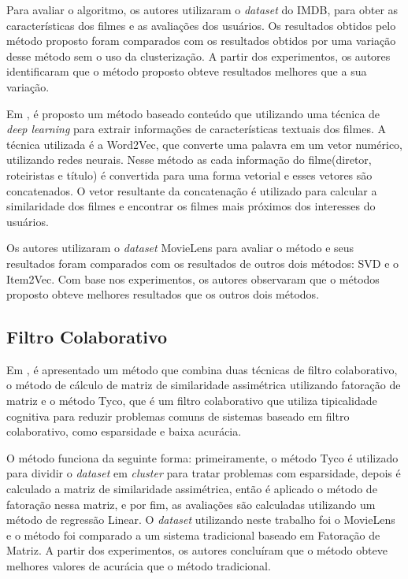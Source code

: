 Para avaliar o algoritmo, os autores utilizaram o \textit{dataset} do IMDB, para obter as características dos filmes e as avaliações dos usuários. Os resultados obtidos pelo método proposto foram comparados com os resultados obtidos por uma variação desse método sem o uso da clusterização. A partir dos experimentos, os autores identificaram que o método proposto obteve resultados melhores que a sua variação.

Em \cite{yoon2018movie}, é proposto um método baseado conteúdo que utilizando uma técnica de \textit{deep learning} para extrair informações de características textuais dos filmes. A técnica utilizada é a Word2Vec, que converte uma palavra em um vetor numérico, utilizando redes neurais. Nesse método as cada informação do filme(diretor, roteiristas e título) é convertida para uma forma vetorial e esses vetores são concatenados. O vetor resultante da concatenação é utilizado para calcular a similaridade dos  filmes e encontrar os filmes mais próximos dos interesses do usuários. 

Os autores utilizaram o \textit{dataset} MovieLens para avaliar o método e seus resultados foram comparados com os resultados de outros dois métodos: SVD e o Item2Vec. Com base nos experimentos, os autores observaram que o métodos proposto obteve melhores resultados que os outros dois métodos.


\subsection{Filtro Colaborativo}
Em \cite{katarya2016effectivecollaborative},  é apresentado um método que combina duas técnicas de filtro colaborativo, o método de cálculo de matriz de similaridade assimétrica utilizando fatoração de matriz e o método Tyco, que é um filtro colaborativo que utiliza tipicalidade cognitiva para reduzir problemas comuns de sistemas baseado em filtro colaborativo, como esparsidade e baixa acurácia. 

O método funciona da seguinte forma: primeiramente, o método Tyco é utilizado para dividir o \textit{dataset} em \textit{cluster} para tratar problemas com esparsidade, depois é calculado a matriz de similaridade assimétrica, então é aplicado o método de fatoração nessa matriz,  e por fim, as avaliações são calculadas utilizando um método de regressão Linear. O \textit{dataset} utilizando neste trabalho foi o MovieLens e  o método foi comparado a um sistema tradicional baseado em Fatoração de Matriz. A partir dos experimentos, os autores concluíram que o método obteve melhores valores de acurácia que o método tradicional.

